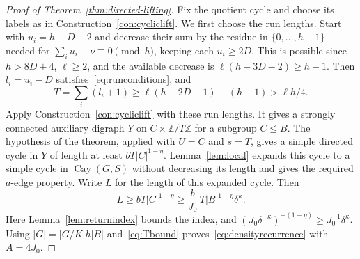 \documentclass[11pt,a4paper,reqno]{amsart}
\theoremstyle{definition}
\theoremstyle{remark}
\numberwithin{equation}{section}
\DeclareMathOperator{\Cay}{Cay}
\newcommand{\Z}{\mathbb Z}
\begin{document}
\begin{proof}[Proof of Theorem~\ref{thm:directed-lifting}]
Fix the quotient cycle and choose its labels as in Construction~\ref{con:cycliclift}. We first choose the run lengths. Start with $u_i=h-D-2$ and decrease their sum by the residue in $\{0,\ldots,h-1\}$ needed for $\sum_i u_i+\nu\equiv0\pmod h$, keeping each $u_i\ge2D$. This is possible since $h>8D+4$, $\ell\ge2$, and the available decrease is $\ell(h-3D-2)\ge h-1$. Then $l_i=u_i-D$ satisfies~\eqref{eq:runconditions}, and
\begin{equation}\label{eq:Tbound}
 T=\sum_i(l_i+1)\ge\ell(h-2D-1)-(h-1)>\ell h/4.
\end{equation}
Apply Construction~\ref{con:cycliclift} with these run lengths. It gives a strongly connected auxiliary digraph $Y$ on $C\times\Z/T\Z$ for a subgroup $C\le B$. The hypothesis of the theorem, applied with $U=C$ and $s=T$, gives a simple directed cycle in $Y$ of length at least $bT|C|^{1-\eta}$. Lemma~\ref{lem:local} expands this cycle to a simple cycle in $\Cay(G,S)$ without decreasing its length and gives the required $a$-edge property. Write $L$ for the length of this expanded cycle. Then
\begin{equation}\label{eq:positionlength}
 L\ge bT|C|^{1-\eta}
 \ge\frac b{J_0}\,T|B|^{1-\eta}\delta^\kappa.
\end{equation}
Here Lemma~\ref{lem:returnindex} bounds the index, and $(J_0\delta^{-\kappa})^{-(1-\eta)}\ge J_0^{-1}\delta^\kappa$. Using $|G|=|G/K|h|B|$ and~\eqref{eq:Tbound} proves~\eqref{eq:densityrecurrence} with $A=4J_0$.
\end{proof}
\end{document}
